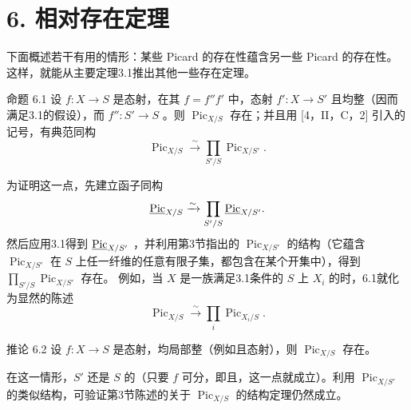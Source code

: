 \section*{6. 相对存在定理}
下面概述若干有用的情形：某些 Picard 的存在性蕴含另一些 Picard 的存在性。这样，就能从主要定理3.1推出其他一些存在定理。

\begin{statement}{命题 6.1}
设 $f:X\to S$ 是态射，在其 $f=f''f'$ 中，态射 $f':X\to S'$ 且均整（因而满足3.1的假设），而 $f'':S'\to S$ 。则 $\operatorname{Pic}_{X/S}$ 存在；并且用 [4，II，C，2] 引入的记号，有典范同构
\[\operatorname{Pic}_{X/S}\xrightarrow{\sim}\prod_{S'/S}\operatorname{Pic}_{X/S'}.\]
\end{statement}
为证明这一点，先建立函子同构
\[\underline{\operatorname{Pic}}_{X/S}\xrightarrow{\sim}\prod_{S'/S}\underline{\operatorname{Pic}}_{X/S'}.\]
然后应用3.1得到 $\underline{\operatorname{Pic}}_{X/S'}$ ，并利用第3节指出的 $\operatorname{Pic}_{X/S'}$ 的结构（它蕴含 $\operatorname{Pic}_{X/S'}$ 在 $S$ 上任一纤维的任意有限子集，都包含在某个开集中），得到 $\prod_{S'/S}\operatorname{Pic}_{X/S'}$ 存在。
例如，当 $X$ 是一族满足3.1条件的 $S$ 上 $X_i$ 的时，6.1就化为显然的陈述
\[\operatorname{Pic}_{X/S}\xrightarrow{\sim}\prod_i\operatorname{Pic}_{X_i/S}.\]

\begin{statement}{推论 6.2}
设 $f:X\to S$ 是态射，均局部整（例如且态射），则 $\operatorname{Pic}_{X/S}$ 存在。
\end{statement}
在这一情形，$S'$ 还是 $S$ 的（只要 $f$ 可分，即且，这一点就成立）。利用 $\operatorname{Pic}_{X/S'}$ 的类似结构，可验证第3节陈述的关于 $\operatorname{Pic}_{X/S}$ 的结构定理仍然成立。

